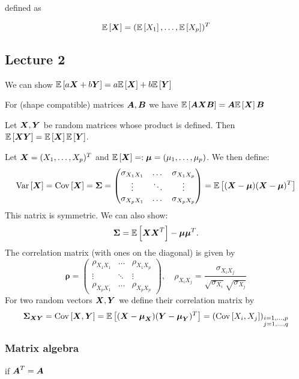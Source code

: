 \textbf{}

 defined as

$$
    \ev{\X} = (\ev{X_1},\dots,\ev{X_p})^T
$$
\subsection*{Lecture 2}

We can show
$
    \ev{a \X + b \Y} = a\ev{\X}+ b \ev{\Y}
$

For (shape compatible) matrices $\mA, \mB$ we have
$
    \ev{\mA\X \mB} = \mA\ev{\X}\mB
$

Let $\X, \Y$ be random matrices whose product is defined. Then $\ev{\X\Y} = \ev{\X}\ev{\Y}$.

\textbf{}

Let $\X=(X_1,\dots,X_p)^T$ and $\ev{\X}=:\M=({\mu_1,\dots,\mu_p})$. We then define:
$$
    \var{\X} = \cov{\X} = \SS = \begin{pmatrix}
        \sigma_{X_1X_1} & \dots & \sigma_{X_1X_p} \\
        \vdots & \ddots & \vdots \\
        \sigma_{X_pX_1} & \dots & \sigma_{X_pX_p}
    \end{pmatrix}
    =\ev{(\X-\M)(\X-\M)^T}
$$
This natrix is symmetric. We can also show:
$$
    \SS = \ev{\X\X^T} - \M\M^T.
$$
The correlation matrix (with ones on the diagonal) is given by
$$
    \boldsymbol{\rho}
    =
    \begin{pmatrix}
        \rho_{X_1X_1} & \dots & \rho_{X_1X_p} \\
        \vdots & \ddots & \vdots \\
        \rho_{X_pX_1} & \dots & \rho_{X_pX_p}
    \end{pmatrix}
    ,\quad
    \rho_{X_iX_j} = \frac{\sigma_{X_iX_j}}{\sqrt{\sigma_{X_i}}\sqrt{\sigma_{X_j}}}
$$
For two random vectors $\X,\Y$ we define their correlation matrix by
$$
    \SS_{\X\Y} 
    = \cov{\X,\Y} 
    = \ev{(\X-\M_{\X})(\Y-\M_{\Y})^T}
    =(\cov{X_i,X_j})_{\substack{i=1,\dots,p \\ j= 1,\dots,q}}
$$


\subsubsection{Matrix algebra}

 if $\mA^T=\mA$

